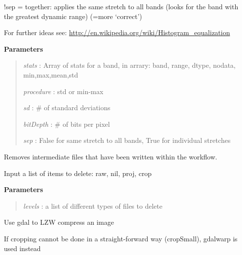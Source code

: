 \documentclass[letterpaper,10pt,openany,oneside]{sphinxmanual}
\begin{document}
\begin{fulllineitems}
\begin{fulllineitems}
!sep = together: applies the same stretch to all bands (looks for the band with the greatest dynamic range) (=more `correct')

For further ideas see: \href{http://en.wikipedia.org/wiki/Histogram\_equalization}{http://en.wikipedia.org/wiki/Histogram\_equalization}

\textbf{Parameters}
\begin{quote}

\emph{stats} : Array of stats for a band, in arrary: band, range, dtype, nodata, min,max,mean,std

\emph{procedure} : std or min-max

\emph{sd} : \# of standard deviations

\emph{bitDepth} : \# of bits per pixel

\emph{sep} : False for same stretch to all bands, True for individual stretches
\end{quote}

\end{fulllineitems}


\begin{fulllineitems}
\label{code:Image.Image.cleanFiles}
Removes intermediate files that have been written within the workflow.

Input a list of items to delete: raw, nil, proj, crop

\textbf{Parameters}
\begin{quote}

\emph{levels} : a list of different types of files to delete
\end{quote}

\end{fulllineitems}


\begin{fulllineitems}
\label{code:Image.Image.compress}
Use gdal to LZW compress an image

\end{fulllineitems}


\begin{fulllineitems}
\label{code:Image.Image.cropBig}
If cropping cannot be done in a straight-forward way (cropSmall), gdalwarp is used instead


\end{fulllineitems}
\end{fulllineitems}
\end{document}
